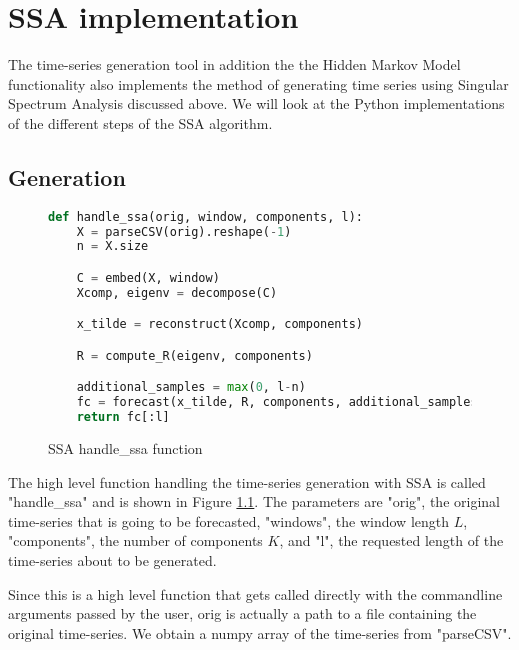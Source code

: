 
\chapter{SSA implementation}\label{chapter:ssa-impl}

The time-series generation tool in addition the the Hidden Markov Model functionality also implements the method of generating time series using Singular Spectrum Analysis discussed above. We will look at the Python implementations of the different steps of the SSA algorithm. \parencite{tsgenerator}

\section{Generation}

\begin{figure}
\begin{singlespace}
\begin{lstlisting}[language=Python]
def handle_ssa(orig, window, components, l):
    X = parseCSV(orig).reshape(-1)
    n = X.size

    C = embed(X, window)
    Xcomp, eigenv = decompose(C)

    x_tilde = reconstruct(Xcomp, components)

    R = compute_R(eigenv, components)

    additional_samples = max(0, l-n)
    fc = forecast(x_tilde, R, components, additional_samples)
    return fc[:l]
\end{lstlisting}
\end{singlespace}
\caption{SSA handle\_ssa function}    
\label{fig:ssa-handle}
\end{figure}

The high level function handling the time-series generation with SSA is called "handle\_ssa" and is shown in Figure \ref{fig:ssa-handle}. The parameters are "orig", the original time-series that is going to be forecasted, "windows", the window length $L$, "components", the number of components $K$, and "l", the requested length of the time-series about to be generated. 

Since this is a high level function that gets called directly with the commandline arguments passed by the user, orig is actually a path to a file containing the original time-series. We obtain a numpy array of the time-series from "parseCSV". 

